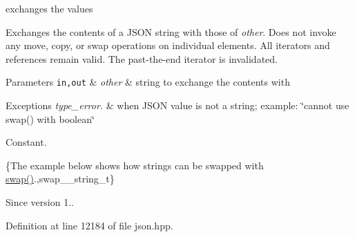 exchanges the values 

Exchanges the contents of a J\+S\+ON string with those of {\itshape other}. Does not invoke any move, copy, or swap operations on individual elements. All iterators and references remain valid. The past-\/the-\/end iterator is invalidated.


\begin{DoxyParams}[1]{Parameters}
\mbox{\tt in,out}  & {\em other} & string to exchange the contents with\\
\hline
\end{DoxyParams}

\begin{DoxyExceptions}{Exceptions}
{\em type\+\_\+error.} & when J\+S\+ON value is not a string; example\+: {\ttfamily \char`\"{}cannot
use swap() with boolean\char`\"{}}\\
\hline
\end{DoxyExceptions}
Constant.

\{The example below shows how strings can be swapped with {\ttfamily \hyperlink{classnlohmann_1_1basic__json_a66d4de311f79f2fe640793ab7a178781}{swap()}}.,swap\+\_\+\+\_\+string\+\_\+t\}

\begin{DoxySince}{Since}
version 1.. 
\end{DoxySince}


Definition at line 12184 of file json.\+hpp.

